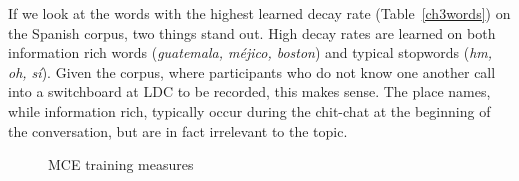 If we look at the words with the highest learned decay rate (Table~\ref{ch3words}) on the Spanish corpus, two things stand out.  High decay rates are learned on both information rich words (\textit{guatemala, méjico, boston}) and typical stopwords (\textit{hm, oh, sí}).  Given the corpus, where participants who do not know one another call into a switchboard at LDC to be recorded, this makes sense.  The place names, while information rich, typically occur during the chit-chat at the beginning of the conversation, but are in fact irrelevant to the topic.


\begin{figure}[t]
	\centering
	\null\hfill
	\hfill
	\hfill\null
	\caption[MCE training]{MCE training measures} 
\end{figure}

